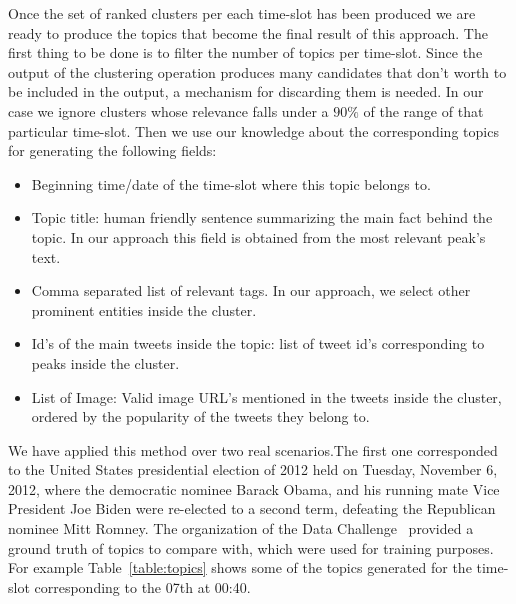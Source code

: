 \documentclass{sig-alternate}
\begin{document}
Once the set of ranked clusters per each time-slot has been produced we are ready to produce the topics that become the final result of this approach. The first thing to be done is to filter the number of topics per time-slot. Since the output of the clustering operation produces many candidates that don't worth to be included in the output, a mechanism for discarding them is needed. In our case we ignore clusters whose relevance falls under a $90\%$ of the range of that particular time-slot. Then we use our knowledge about the corresponding topics for generating the following fields:
\begin{itemize}
  \item Beginning time/date of the time-slot where this topic belongs to.
  \item Topic title: human friendly sentence summarizing the main fact behind the topic. In our approach this field is obtained from the most relevant peak's text.
  \item Comma separated list of relevant tags. In our approach, we select other prominent entities inside the cluster.
  \item Id's of the main tweets inside the topic: list of tweet id's corresponding to peaks inside the cluster.
  \item List of Image: Valid image URL's mentioned in the tweets inside the cluster, ordered by the popularity of the tweets they belong to.
\end{itemize}

We have applied this method over two real scenarios.The first one corresponded to the United States presidential election of 2012 held on Tuesday, November 6, 2012, where the democratic nominee Barack Obama, and his running mate Vice President Joe Biden were re-elected to a second term, defeating the Republican nominee Mitt Romney. The organization of the Data Challenge~\cite{snow2014dc} provided a ground truth of topics to compare with, which were used for training purposes. For example Table~\ref{table:topics} shows some of the topics generated for the time-slot corresponding to the 07th at 00:40.
\end{document}
